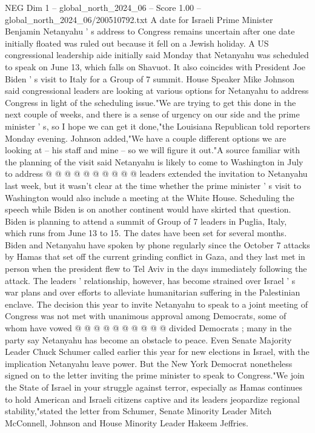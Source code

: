 \begin{textsample}{NEG Dim 1 – global\_north\_2024\_06 – Score 1.00 – global\_north\_2024\_06/200510792.txt}  \label{ex:f1_neg_215}
A date for Israeli Prime Minister Benjamin Netanyahu ' s address to Congress remains uncertain after one date initially floated was ruled out because it fell on a Jewish holiday.
A US congressional leadership aide initially said Monday that Netanyahu was scheduled to speak on June 13, which falls on Shavuot.
It also coincides with President Joe Biden ' s visit to Italy for a Group of 7 summit.
House Speaker Mike Johnson said congressional leaders are looking at various options for Netanyahu to address Congress in light of the scheduling issue."We are trying to get this done in the next couple of weeks, and there is a sense of urgency on our side and the prime minister ' s, so I hope we can get it done,"the Louisiana Republican told reporters Monday evening.
Johnson added,"We have a couple different options we are looking at -- his staff and mine -- so we will figure it out."A source familiar with the planning of the visit said Netanyahu is likely to come to Washington in July to address @ @ @ @ @ @ @ @ @ @ leaders extended the invitation to Netanyahu last week, but it wasn't clear at the time whether the prime minister ' s visit to Washington would also include a meeting at the White House.
Scheduling the speech while Biden is on another continent would have skirted that question.
Biden is planning to attend a summit of Group of 7 leaders in Puglia, Italy, which runs from June 13 to 15.
The dates have been set for several months.
Biden and Netanyahu have spoken by phone regularly since the October 7 attacks by Hamas that set off the current grinding conflict in Gaza, and they last met in person when the president flew to Tel Aviv in the days immediately following the attack.
The leaders ' relationship, however, has become strained over Israel ' s war plans and over efforts to alleviate humanitarian suffering in the Palestinian enclave.
The decision this year to invite Netanyahu to speak to a joint meeting of Congress was not met with unanimous approval among Democrats, some of whom have vowed @ @ @ @ @ @ @ @ @ @ divided Democrats ; many in the party say Netanyahu has become an obstacle to peace.
Even Senate Majority Leader Chuck Schumer called earlier this year for new elections in Israel, with the implication Netanyahu leave power.
But the New York Democrat nonetheless signed on to the letter inviting the prime minister to speak to Congress."We join the State of Israel in your struggle against terror, especially as Hamas continues to hold American and Israeli citizens captive and its leaders jeopardize regional stability,"stated the letter from Schumer, Senate Minority Leader Mitch McConnell, Johnson and House Minority Leader Hakeem Jeffries.

\end{textsample}
